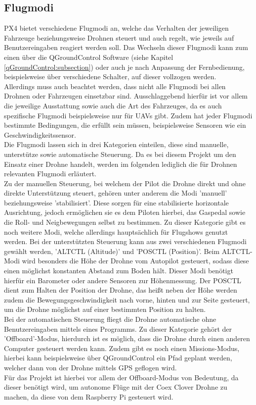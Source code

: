 \subsection{Flugmodi}
PX4 bietet verschiedene Flugmodi an, welche das Verhalten der jeweiligen Fahrzeuge beziehungsweise Drohnen steuert und auch regelt, wie jeweils auf Benutzereingaben reagiert werden soll. Das Wechseln dieser Flugmodi kann zum einen über die QGroundControl Software (siehe Kapitel \ref{qGroundControl:subsection}) oder auch je nach Anpassung der Fernbedienung, beispielsweise über verschiedene Schalter, auf dieser vollzogen werden. \\
Allerdings muss auch beachtet werden, dass nicht alle Flugmodi bei allen Drohnen oder Fahrzeugen einsetzbar sind. Ausschlaggebend hierfür ist vor allem die jeweilige Ausstattung sowie auch die Art des Fahrzeuges, da es auch spezifische Flugmodi beispielsweise nur für \ac{UAV}s gibt. Zudem hat jeder Flugmodi bestimmte Bedingungen, die erfüllt sein müssen, beispielsweise Sensoren wie ein Geschwindigkeitssensor. \\
Die Flugmodi lassen sich in drei Kategorien einteilen, diese sind manuelle, unterstütze sowie automatische Steuerung.
Da es bei diesem Projekt um den Einsatz einer Drohne handelt, werden im folgenden lediglich die für Drohnen relevanten Flugmodi erläutert.\\
Zu der manuellen Steuerung, bei welchem der Pilot die Drohne direkt und ohne direkte Unterstützung steuert, gehören unter anderem die Modi 'manuell' beziehungsweise 'stabilisiert'. Diese sorgen für eine stabilisierte horizontale Ausrichtung, jedoch ermöglichen sie es dem Piloten hierbei, das Gaspedal sowie die Roll- und Neigbewegungen selbst zu bestimmen. Zu dieser Kategorie gibt es noch weitere Modi, welche allerdings hauptsächlich für Flugshows genutzt werden.
Bei der unterstützten Steuerung kann aus zwei verschiedenen Flugmodi gewählt werden, 'ALTCTL (Altitude)' und 'POSCTL (Position)'. Beim ALTCTL-Modi wird besonders die Höhe der Drohne vom Autopilot gesteuert, sodass diese einen möglichst konstanten Abstand zum Boden hält. Dieser Modi benötigt hierfür ein Barometer oder andere Sensoren zur Höhenmessung.
Der POSCTL dient zum Halten der Position der Drohne, das heißt neben der Höhe werden zudem die Bewegungsgeschwindigkeit nach vorne, hinten und zur Seite gesteuert, um die Drohne möglichst auf einer bestimmten Position zu halten.\\
Bei der automatischen Steuerung fliegt die Drohne automatische ohne Benutzereingaben mittels eines Programms. Zu dieser Kategorie gehört der 'Offboard'-Modus, hierdurch ist es möglich, dass die Drohne durch einen anderen Computer gesteuert werden kann. Zudem gibt es noch einen Missions-Modus, hierbei kann beispielsweise über QGroundControl ein Pfad geplant werden, welcher dann von der Drohne mittels GPS geflogen wird. \\
Für das Projekt ist hierbei vor allem der Offboard-Modus von Bedeutung, da dieser benötigt wird, um autonome Flüge mit der Coex Clover Drohne zu machen, da diese von dem Raspberry Pi gesteuert wird. \cite[vgl.][]{flight-modes}


